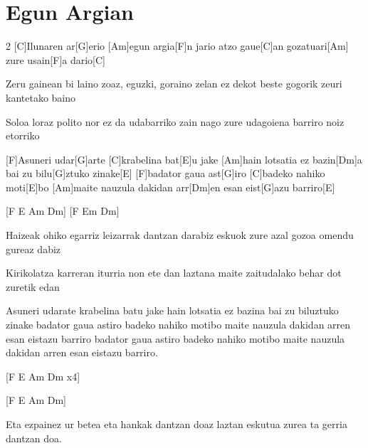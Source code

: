 \section{Egun Argian}
\begin{guitar}
\begin{multicols}{2}
[C]Ilunaren ar[G]erio
[Am]egun argia[F]n jario
atzo gaue[C]an gozatuari[Am]{}
zure usain[F]a dario[C]{}


Zeru gainean bi laino
zoaz, eguzki, goraino
zelan ez dekot beste gogorik
zeuri kantetako baino


Soloa loraz polito
nor ez da udabarriko
zain nago zure udagoiena
barriro noiz etorriko


[F]Asuneri udar[G]arte
[C]krabelina bat[E]u jake
[Am]hain lotsatia ez bazin[Dm]a bai
zu bilu[G]ztuko zinake[E]{}
[F]badator gaua ast[G]iro
[C]badeko nahiko moti[E]bo
[Am]maite nauzula dakidan arr[Dm]en
esan eist[G]azu barriro[E]{}


[F  E  Am  Dm]{}
[F  Em  Dm]{}

Haizeak ohiko egarriz
leizarrak dantzan darabiz
eskuok zure azal gozoa
omendu gureaz dabiz

Kirikolatza karreran
iturria non ete dan
laztana maite zaitudalako
behar dot zuretik edan

Asuneri udarate
krabelina batu jake
hain lotsatia ez bazina bai
zu biluztuko zinake
badator gaua astiro
badeko nahiko motibo
maite nauzula dakidan arren
esan eistazu barriro
badator gaua astiro
badeko nahiko motibo
maite nauzula dakidan arren
esan eistazu barriro.


[F   E   Am   Dm  x4]{}


[F   E   Am    Dm]{}

Eta ezpainez ur betea
eta hankak dantzan doaz
laztan eskutua zurea
ta gerria dantzan doa.
\end{multicols}
\end{guitar}
